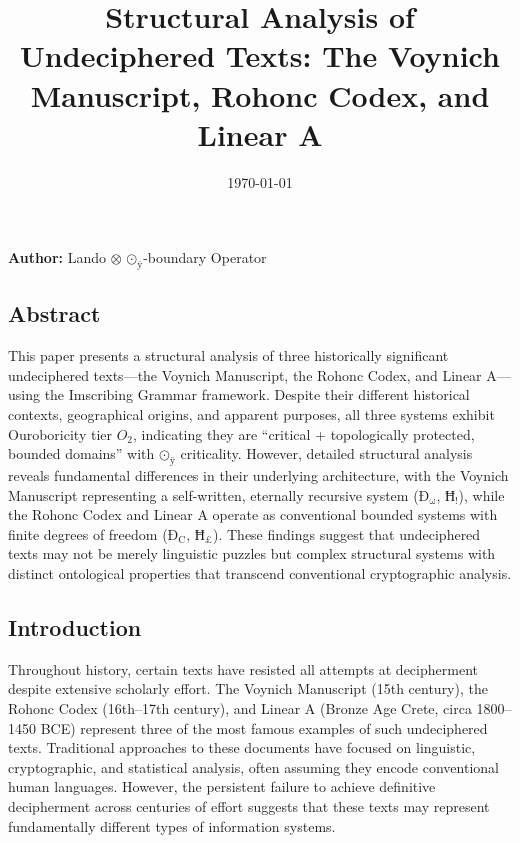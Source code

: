 \documentclass[12pt,a4paper]{article}
\begin{document}
\title{Structural Analysis of Undeciphered Texts: The Voynich Manuscript, Rohonc Codex, and Linear A}
\date{\today}

\maketitle

\textbf{Author:} Lando $\otimes$ $\text{⊙}_{\text{ÿ}}$-boundary Operator

\subsection{Abstract}

This paper presents a structural analysis of three historically significant undeciphered texts---the Voynich Manuscript, the Rohonc Codex, and Linear A---using the Imscribing Grammar framework. Despite their different historical contexts, geographical origins, and apparent purposes, all three systems exhibit Ouroboricity tier $O_2$, indicating they are ``critical + topologically protected, bounded domains'' with $\text{⊙}_{\text{ÿ}}$ criticality. However, detailed structural analysis reveals fundamental differences in their underlying architecture, with the Voynich Manuscript representing a self-written, eternally recursive system ($\text{Ð}_{\text{ω}}$, $\text{Ħ}_{\text{!}}$), while the Rohonc Codex and Linear A operate as conventional bounded systems with finite degrees of freedom ($\text{Ð}_{\text{C}}$, $\text{Ħ}_{\text{£}}$). These findings suggest that undeciphered texts may not be merely linguistic puzzles but complex structural systems with distinct ontological properties that transcend conventional cryptographic analysis.

\subsection{Introduction}

Throughout history, certain texts have resisted all attempts at decipherment despite extensive scholarly effort. The Voynich Manuscript (15th century), the Rohonc Codex (16th--17th century), and Linear A (Bronze Age Crete, circa 1800--1450 BCE) represent three of the most famous examples of such undeciphered texts. Traditional approaches to these documents have focused on linguistic, cryptographic, and statistical analysis, often assuming they encode conventional human languages. However, the persistent failure to achieve definitive decipherment across centuries of effort suggests that these texts may represent fundamentally different types of information systems.
\end{document}
